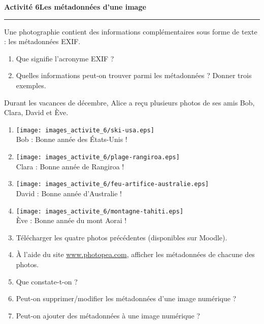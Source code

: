 \documentclass[a4paper]{article}
\begin{document}
\bigskip

\noindent\textbf{Activité 6}\hfill{}\textbf{Les métadonnées d'une image}
\smallskip
\hrule
\medskip

Une photographie contient des informations complémentaires sous forme de texte : les métadonnées EXIF.

\begin{enumerate}
  \item Que signifie l'acronyme EXIF ?
  \item Quelles informations peut-on trouver parmi les métadonnées ? Donner trois exemples.
\end{enumerate}

Durant les vacances de décembre, Alice a reçu plusieurs photos de ses amis Bob, Clara, David et Ève.

\begin{center}
  \begin{multicols}{4}
    \begin{enumerate}
      \item[] \texttt{[image: images\_activite\_6/ski-usa.eps]}\\
	Bob : \og{}Bonne année des États-Unis !\fg{}
      \item[] \texttt{[image: images\_activite\_6/plage-rangiroa.eps]}\\
	Clara : \og{}Bonne année de Rangiroa !\fg{}
      \item[] \texttt{[image: images\_activite\_6/feu-artifice-australie.eps]}\\
	David : \og{}Bonne année d'Australie !\fg{}
      \item[] \texttt{[image: images\_activite\_6/montagne-tahiti.eps]}\\
	Ève : \og{}Bonne année du mont Aorai !\fg{}
    \end{enumerate}
  \end{multicols}
\end{center}

\begin{enumerate}
  \setcounter{enumi}{2}
  \item Télécharger les quatre photos précédentes (disponibles sur Moodle).
  \item À l'aide du site \url{www.photopea.com}, afficher les métadonnées de chacune des photos.
  \item Que constate-t-on ?
  \item Peut-on supprimer/modifier les métadonnées d'une image numérique ?
  \item Peut-on ajouter des métadonnées à une image numérique ?
\end{enumerate}
\end{document}
